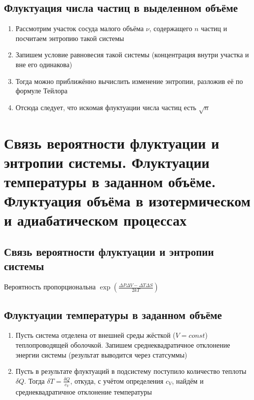 \documentclass[a4paper, 14pt]{article}
\begin{document}
    \subsection{Флуктуация числа частиц в выделенном объёме}
    
    \begin{enumerate}
        \item Рассмотрим участок сосуда малого объёма $\nu$, содержащего $n$ частиц и посчитаем энтропию такой системы
        \item Запишем условие равновесия такой системы (концентрация внутри участка и вне его одинакова)
        \item Тогда можно приближённо вычислить изменение энтропии, разложив её по формуле Тейлора
        \item Отсюда следует, что искомая флуктуации числа частиц есть $\sqrt{n}$
    \end{enumerate}
    
    \section{Связь вероятности флуктуации и энтропии системы.
    Флуктуации температуры в заданном объёме.
    Флуктуация объёма в изотермическом и адиабатическом процессах}
    
    \subsection{Связь вероятности флуктуации и энтропии системы}
    
    Вероятность пропорциональна $\exp \left(\frac{\Delta P \Delta V - \Delta T \Delta S}{2kT}\right)$
    
    \subsection{Флуктуации температуры в заданном объёме}
    
    \begin{enumerate}
        \item Пусть система отделена от внешней среды жёсткой ($V = const$) теплопроводящей оболочкой.
        Запишем среднеквадратичное отклонение энергии системы (результат выводится через статсуммы)
        \item Пусть в результате флуктуаций в подсистему поступило количество теплоты $\delta Q$.
        Тогда $\delta T = \frac{\delta Q}{c_V}$, откуда, с учётом определения $c_V$, найдём и среднеквадратичное
        отклонение температуры
    \end{enumerate}
    
\end{document}
